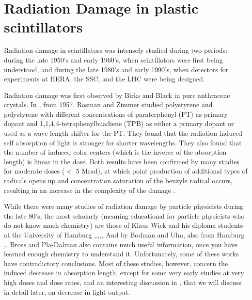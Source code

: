\section{Radiation Damage in plastic scintillators}
Radiation damage
in scintillators was intensely studied during two periods:
during the late 1950's and early 1960's, when
scintillators were first being understood, and during the late 1980's
and early 1990's, when detectors for experiments at HERA, the SSC,
and the LHC were being designed.

Radiation damage was first observed by Birks and Black \cite{birksblack}
in pure anthracene crystals.
In \cite{rosmanzimmer}, from 1957, Rosman and Zimmer studied
 polystyrene and polystyrene with
different concentrations of paraterphenyl (PT) as primary dopant
and 1,1,4,4-tetraphenylbuadiene (TPB) as either a primary dopant or used
as a wave-length shifter for the PT.
They found that the radiation-induced self absorption
of light is stronger for shorter wavelengths.  They also found
that the number of induced color centers (which is the inverse 
of the absorption length) is linear in the dose.
Both results have been
confirmed by many studies for moderate doses ($<$ 5 Mrad),
at which point production of additional types of radicals opens up
and concentration saturation of the benzyle radical occurs,
resulting in an increase in the complexity of the damage \cite{harrah}.


While there were many studies of radiation damage by particle physicists
during the late 80's,
the most scholarly (meaning educational for
particle physicists who do not know much chemistry)
 are those of Klaus Wick and his diploma
students at the University of Hamburg 
\cite{34504},\cite{Wick1991472},\cite{289295},\cite{173180},\cite{467829},\cite{Wulkop1995141}
And by Bodman and Ulm, also from Hamburg \cite{Bodmann2001299},\cite{Bodmann2003495}.  Bross and Pla-Dalmau \cite{173178} also contains much useful
information, once you have learned enough chemistry to understand it.
Unfortunately, some of these works have
contradictory conclusions.
Most of these studies, however, concern the induced decrease
in absorption length, except for some very early studies
at very high doses and dose rates, and
an interesting discussion in
\cite{Wick1991472}, that we will discuss in detail later, on
decrease in light output.


